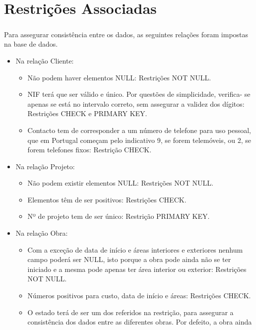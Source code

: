 \documentclass{report}
\begin{document}
	\chapter{Restrições Associadas}
		
		\paragraph{}Para assegurar consistência entre os dados, as seguintes relações foram
		impostas na base de dados.
		
		\begin{itemize}
			\item Na relação Cliente:
			\begin{itemize}
				\item Não podem haver elementos NULL: Restrições NOT NULL.
				\item NIF terá que ser válido e único. Por questões de simplicidade, verifica-
				se apenas se está no intervalo correto, sem assegurar a validez dos dígitos: 
				Restrições CHECK e PRIMARY KEY.
				\item Contacto tem de corresponder a um número de telefone para uso pessoal, 
				que em Portugal começam pelo indicativo 9, se forem telemóveis, ou 2, se forem 
				telefones fixos: Restrição CHECK.
			\end{itemize}
			\item Na relação Projeto:
			\begin{itemize}
				\item Não podem existir elementos NULL: Restrições NOT NULL.
				\item Elementos têm de ser positivos: Restrições CHECK.
				\item Nº de projeto tem de ser único: Restrição PRIMARY KEY.
			\end{itemize}
			\item Na relação Obra:
			\begin{itemize}
				\item Com a exceção de data de início e áreas interiores e exteriores nenhum 
				campo poderá ser NULL, isto porque a obra pode ainda não se ter iniciado e a 
				mesma pode apenas ter área interior ou exterior: Restrições NOT NULL.
				\item Números positivos para custo, data de início e áreas: Restrições CHECK.
				\item O estado terá de ser um dos referidos na restrição, para assegurar a 
				consistência dos dados entre as diferentes obras. Por defeito, a obra ainda 

\end{itemize}
\end{itemize}
\end{document}
